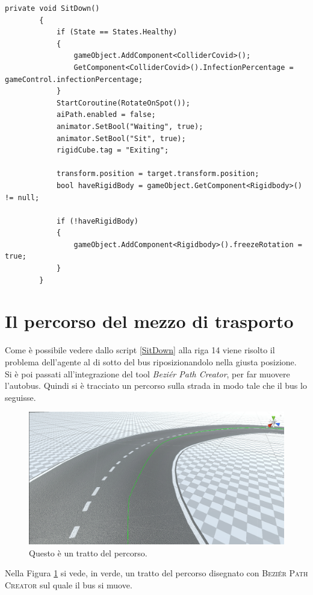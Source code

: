 \documentclass[12pt, openany]{book}
\begin{document}
	\begin{lstlisting}[language={[Sharp]C}, caption={Metodo per la seduta degli agenti}, label={SitDown}]
		private void SitDown()
		{
			if (State == States.Healthy)
			{
				gameObject.AddComponent<ColliderCovid>();
				GetComponent<ColliderCovid>().InfectionPercentage = 	gameControl.infectionPercentage;
			}
			StartCoroutine(RotateOnSpot());
			aiPath.enabled = false;
			animator.SetBool("Waiting", true);
			animator.SetBool("Sit", true);
			rigidCube.tag = "Exiting";
			
			transform.position = target.transform.position;
			bool haveRigidBody = gameObject.GetComponent<Rigidbody>() != null;
			
			if (!haveRigidBody)
			{
				gameObject.AddComponent<Rigidbody>().freezeRotation = true;
			}
		}
	\end{lstlisting}
	\section{Il percorso del mezzo di trasporto}
	Come è possibile vedere dallo script \ref{SitDown} alla riga 14 viene risolto il problema dell'agente al di sotto del bus riposizionandolo nella giusta posizione.\\
	Si è poi passati all'integrazione del tool \emph{Beziér Path Creator}, per far muovere l'autobus. Quindi si è tracciato un percorso sulla strada in modo tale che il bus lo seguisse.
	\begin{figure}[H]
		\centering
		\includegraphics[width=1\linewidth]{"Immagini/BezierPath.png"}
		\caption{Questo è un tratto del percorso.}
		\label{fig:BezierPath}
	\end{figure}
	Nella Figura \ref{fig:BezierPath} si vede, in verde, un tratto del percorso disegnato con \textsc{Beziér Path Creator} sul quale il bus si muove.\\
\end{document}
